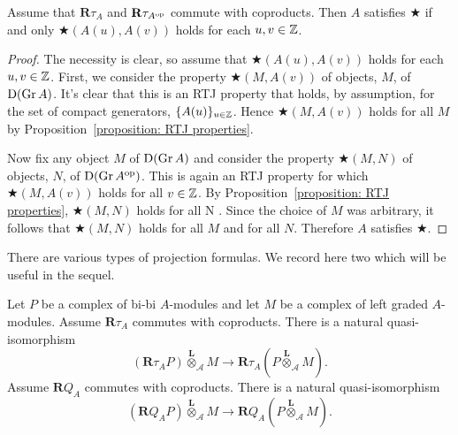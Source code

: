 \begin{proposition} \label{proposition: big star condition}
  Assume that \(\mathbf{R}\tau_A\) and \(\mathbf{R}\tau_{A^{\operatorname{op}}}\) commute with coproducts. Then \(A\) satisfies \(\bigstar\) if and only \(\bigstar( A(u), A(v) )\) holds for each \(u,v \in \mathbb{Z}\).
\end{proposition}

\begin{proof}
  The necessity is clear, so assume that \(\bigstar(A(u), A(v))\) holds for each \(u,v \in \mathbb{Z}\).
  First, we consider the property \(\bigstar(M, A(v))\) of objects, \(M\), of \(\mathrm{D}(\operatorname{Gr}A)\).
  It's clear that this is an RTJ property that holds, by assumption, for the set of compact generators, \(\{A(u)\}_{u \in \mathbb{Z}}\).
  Hence \(\bigstar(M,A(v))\) holds for all \(M\) by Proposition~\ref{proposition: RTJ properties}.

  Now fix any object \(M\) of \(\mathrm{D}(\operatorname{Gr}A)\) and consider the property \(\bigstar(M, N)\) of objects, \(N\), of \(\mathrm{D}(\operatorname{Gr}A^{\operatorname{op}})\).
  This is again an RTJ property for which \(\bigstar(M,A(v))\) holds for all \(v \in \mathbb{Z}\).
  By Proposition~\ref{proposition: RTJ properties}, \(\bigstar(M,N)\) holds for all N .
  Since the choice of \(M\) was arbitrary, it follows that \(\bigstar(M,N)\) holds for all \(M\) and for all \(N\).
  Therefore \(A\) satisfies \(\bigstar\).
\end{proof}

There are various types of projection formulas.
We record here two which will be useful in the sequel.

\begin{proposition} \label{proposition: projection formula}
  Let \(P\) be a complex of bi-bi \(A\)-modules and let \(M\) be a complex of left graded \(A\)-modules. Assume \(\mathbf{R} \tau_A\) commutes with coproducts. There is a natural quasi-isomorphism
  \begin{displaymath}
    ( \mathbf{R} \tau_A P ) \overset{\mathbf{L}}{\otimes}_{\mathcal A} M \to \mathbf{R} \tau_A \left( P \overset{\mathbf{L}}{\otimes}_{\mathcal A} M \right).
  \end{displaymath}
  Assume \(\mathbf{R} Q_A\) commutes with coproducts. There is a natural quasi-isomorphism
  \begin{displaymath}
    ( \mathbf{R} Q_A P ) \overset{\mathbf{L}}{\otimes}_{\mathcal A} M \to \mathbf{R} Q_A \left( P \overset{\mathbf{L}}{\otimes}_{\mathcal A} M \right).
  \end{displaymath}
\end{proposition}

